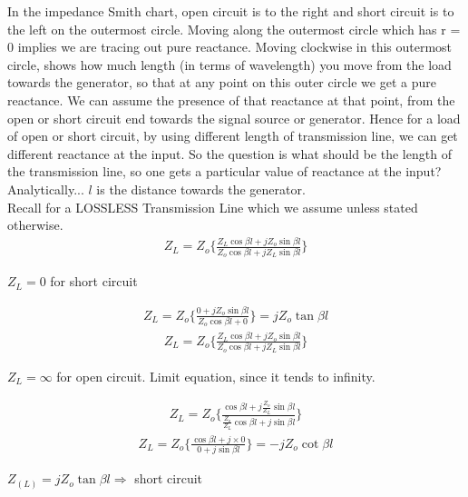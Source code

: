 In the impedance Smith chart, open circuit is to the right and
short circuit is to the left on the outermost circle. Moving along
the outermost circle which has r = 0 implies we are tracing
out pure reactance. Moving clockwise in this outermost circle,
shows how much length (in terms of wavelength) you move from
the load towards the generator, so that at any point on this outer
circle we get a pure reactance. We can assume the presence of
that reactance at that point, from the open or short circuit end
towards the signal source or generator.
Hence for a load of open or short circuit, by using different length of transmission line, we can get different reactance at the input. So the question is what should be the length of the transmission line, so one gets a particular value of reactance at the input?\\
Analytically...
$ l $ is the distance towards the generator.\\ Recall for a LOSSLESS Transmission Line which we assume unless stated otherwise.
\begin{align*}
Z_{L} = Z_o \{ \frac{Z_{L}\cos\beta l + jZ_o\sin\beta l}{Z_o\cos\beta l + jZ_{L}\sin\beta l}\}  
\end{align*}
\begin{center}
$Z_{L} = 0$ for short circuit 
\end{center}
\begin{align}
Z_{L} = Z_o \{ \frac{0 + jZ_o\sin\beta l}{Z_o\cos\beta l + 0}\}  = jZ_o\tan\beta l
\end{align}
\begin{align*}
Z_{L} = Z_o \{ \frac{Z_{L}\cos\beta l + jZ_o\sin\beta l}{Z_o\cos\beta l + jZ_{L}\sin\beta l}\}  
\end{align*}
\begin{center}
$Z_{L} = \infty$ for open circuit. Limit equation, since it tends to infinity. 
\end{center}
\begin{align*}
Z_{L} = Z_o \{ \frac{\cos\beta l + j\frac{Z_o}{Z_{L}}\sin\beta l}{\frac{Z_o}{Z_{L}}\cos\beta l + j\sin\beta l}\}  
\end{align*}
\begin{align}
Z_{L} = Z_o \{ \frac{\cos\beta l + j \times 0}{0 + j\sin\beta l}\} = -jZ_o\cot\beta l  
\end{align}
\begin{center}
$ Z_{(L)} = jZ_o\tan\beta l \Rightarrow $ short circuit\\ 
\end{center}


